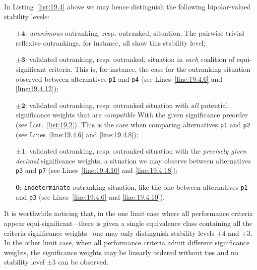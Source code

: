 In Listing~\ref{list:19.4} above we may hence distinguish the following bipolar-valued stability levels:
\begin{itemize}[leftmargin=1cm]
\item [$\mathbf{\pm 4}$:] \emph{unanimous} outranking, resp. outranked, situation. The pairwise trivial reflexive outrankings, for instance, all show this stability level;
\item [$\mathbf{\pm 3}$:] validated outranking, resp. outranked, situation in \emph{each} coalition of equi-significant criteria. This is, for instance, the case for the outranking situation observed between alternatives \texttt{p1} and \texttt{p4} (see Lines~\ref{line:19.4.6} and \ref{line:19.4.12});
\item [$\mathbf{\pm 2}$:] validated outranking, resp. outranked situation with \emph{all} potential significance weights that are \emph{compatible} With the given significance preorder (see List.~\vref{list:19.2}). This is the case when comparing alternatives \texttt{p1} and \texttt{p2} (see Lines~\ref{line:19.4.6} and \ref{line:19.4.8});
\item [$\mathbf{\pm 1}$:] validated outranking, resp. outranked situation with the \emph{precisely given decimal} significance weights, a situation we may observe between alternatives \texttt{p3} and \texttt{p7} (see Lines~\ref{line:19.4.10} and \ref{line:19.4.18});
\item [$\mathbf{0}$:] \texttt{indeterminate} outranking situation, like the one between alternatives \texttt{p1} and \texttt{p3} (see Lines~\ref{line:19.4.6} and \ref{line:19.4.10}).
\end{itemize}

It is worthwhile noticing that, in the one limit case where all performance criteria appear equi-significant --there is given a single equivalence class containing all the criteria significance weights-- one may only distinguish stability levels $\pm 4$ and $\pm 3$. In the other limit case, when all performance criteria admit different significance weights, the significance weights may be linearly ordered without ties and no stability level $\pm 3$ can be observed.


